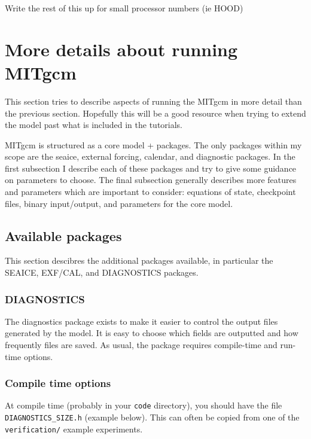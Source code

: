 \documentclass[11pt]{article}
\begin{document}
Write the rest of this up for small processor numbers (ie HOOD)




\section{More details about running MITgcm}
This section tries to describe aspects of running the MITgcm in more detail than the previous section. Hopefully this will be a good resource when trying to extend the model past what is included in the tutorials.

MITgcm is structured as a core model + packages. The only packages within my scope are the seaice, external forcing, calendar, and diagnostic packages. In the first subsection I describe each of these packages and try to give some guidance on parameters to choose. The final subsection generally describes more features and parameters which are important to consider: equations of state, checkpoint files, binary input/output, and parameters for the core model.

\subsection{Available packages}
This section descibres the additional packages available, in particular the SEAICE, EXF/CAL, and DIAGNOSTICS packages.

\subsubsection{DIAGNOSTICS}
The diagnostics package exists to make it easier to control the output files generated by the model. It is easy to choose which fields are outputted and how frequently files are saved. As usual, the package requires compile-time and run-time options.

\subsubsection*{Compile time options}
At compile time (probably in your \verb|code| directory), you should have the file \verb|DIAGNOSTICS_SIZE.h| (example below). This can often be copied from one of the \verb|verification/| example experiments.
\end{document}
